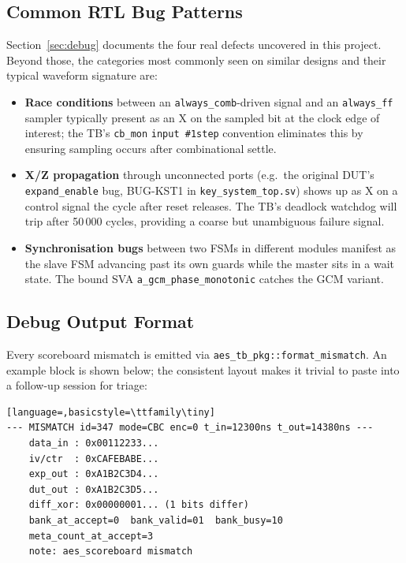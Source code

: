 \documentclass[conference,10pt,a4paper]{IEEEtran}
\begin{document}
\subsection{Common RTL Bug Patterns}
Section~\ref{sec:debug} documents the four real defects uncovered in
this project.  Beyond those, the categories most commonly seen on
similar designs and their typical waveform signature are:
\begin{itemize}[leftmargin=*]
  \item \textbf{Race conditions} between an \texttt{always\_comb}-driven
        signal and an \texttt{always\_ff} sampler typically present as
        an X on the sampled bit at the clock edge of interest; the
        TB's \texttt{cb\_mon} \texttt{input\,\#1step} convention
        eliminates this by ensuring sampling occurs after combinational
        settle.
  \item \textbf{X/Z propagation} through unconnected ports (e.g.\ the
        original DUT's \texttt{expand\_enable} bug, BUG-KST1 in
        \texttt{key\_system\_top.sv}) shows up as X on a control signal
        the cycle after reset releases.  The TB's deadlock watchdog
        will trip after 50\,000 cycles, providing a coarse but
        unambiguous failure signal.
  \item \textbf{Synchronisation bugs} between two FSMs in different
        modules manifest as the slave FSM advancing past its own
        guards while the master sits in a wait state.  The bound SVA
        \texttt{a\_gcm\_phase\_monotonic} catches the GCM variant.
\end{itemize}

\subsection{Debug Output Format}
Every scoreboard mismatch is emitted via
\texttt{aes\_tb\_pkg::format\_mismatch}.  An example block is shown
below; the consistent layout makes it trivial to paste into a follow-up
session for triage:
\begin{lstlisting}[language=,basicstyle=\ttfamily\tiny]
--- MISMATCH id=347 mode=CBC enc=0 t_in=12300ns t_out=14380ns ---
    data_in : 0x00112233...
    iv/ctr  : 0xCAFEBABE...
    exp_out : 0xA1B2C3D4...
    dut_out : 0xA1B2C3D5...
    diff_xor: 0x00000001... (1 bits differ)
    bank_at_accept=0  bank_valid=01  bank_busy=10
    meta_count_at_accept=3
    note: aes_scoreboard mismatch
\end{lstlisting}
\end{document}
